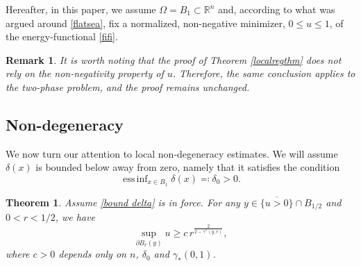 \documentclass[reqno,11pt]{amsart}
\DeclareMathOperator*{\ess}{ess\,}
\newtheorem{theorem}{Theorem}[section]
\newtheorem{remark}{Remark}[section]
\newcommand{\1}{\mathds{1}}
\numberwithin{equation}{section}
\begin{document}
Hereafter, in this paper, we assume $\Omega = B_1 \subset \mathbb{R}^n$ and, according to what was argued around \eqref{flatsea}, fix a normalized, non-negative minimizer, $0\le u \le 1$, of the energy-functional \eqref{fifi}. 

\begin{remark} It is worth noting that the proof of Theorem \ref{localregthm} does not rely on the non-negativity property of $u$. Therefore, the same conclusion applies to the two-phase problem, and the proof remains unchanged.

\end{remark}

\subsection{Non-degeneracy}

We now turn our attention to local non-degeneracy estimates. We will assume $\delta(x)$ is bounded below away from zero, namely that it satisfies the condition
\begin{equation}\label{bound delta}
	 \mathop{\ess \inf}_{x\in B_1} \delta(x) \eqqcolon \delta_0>0. 
\end{equation} 

\begin{theorem}\label{nondeg}
Assume \eqref{bound delta} is in force. For any $y \in \overline{\{u>0\}}\cap B_{1/2}$ and $0<r < 1/2$, we have
\begin{equation}\label{nondeg_est}
	\sup_{\partial B_r(y)} u \geq c \, r^{\frac{2}{2-\gamma^\ast(y,r)}},
\end{equation}
where $c>0$ depends only on $n$, $\delta_0$ and $\gamma_\ast (0,1)$.
\end{theorem}
\end{document}

